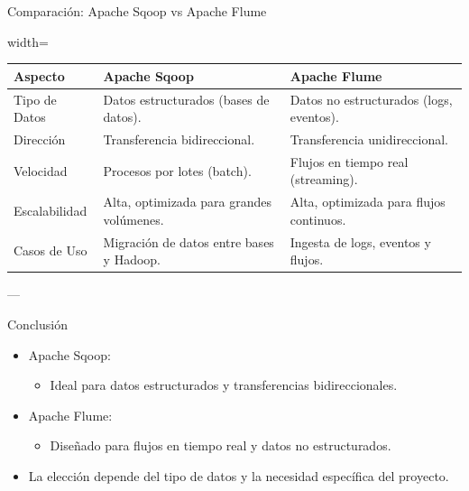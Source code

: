 \documentclass[presentation]{beamer}
\begin{document}
\begin{frame}[label={sec:org04dd658}]{Comparación: Apache Sqoop vs Apache Flume}
\begin{LATEX}\centering
\begin{adjustbox}{width=\linewidth}
\begin{tabular}{|l|l|l|}
\hline
\textbf{Aspecto} & \textbf{Apache Sqoop} & \textbf{Apache Flume} \\
\hline
Tipo de Datos    & Datos estructurados (bases de datos). & Datos no estructurados (logs, eventos). \\
Dirección        & Transferencia bidireccional. & Transferencia unidireccional. \\
Velocidad        & Procesos por lotes (batch). & Flujos en tiempo real (streaming). \\
Escalabilidad    & Alta, optimizada para grandes volúmenes. & Alta, optimizada para flujos continuos. \\
Casos de Uso     & Migración de datos entre bases y Hadoop. & Ingesta de logs, eventos y flujos. \\
\hline
\end{tabular}
\end{adjustbox}
\end{LATEX}

---
\end{frame}

\begin{frame}[label={sec:org7dfc674}]{Conclusión}
\begin{itemize}
\item \alert{\alert{Apache Sqoop}}:
\begin{itemize}
\item Ideal para datos estructurados y transferencias bidireccionales.
\end{itemize}
\item \alert{\alert{Apache Flume}}:
\begin{itemize}
\item Diseñado para flujos en tiempo real y datos no estructurados.
\end{itemize}
\item La elección depende del tipo de datos y la necesidad específica del proyecto.
\end{itemize}
\end{frame}
\end{document}
